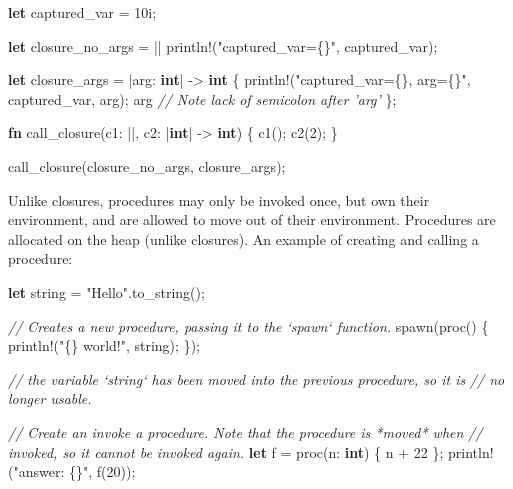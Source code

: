 \documentclass[]{article}
\newenvironment{Shaded}{}{}
\newcommand{\KeywordTok}[1]{\textcolor[rgb]{0.00,0.44,0.13}{\textbf{{#1}}}}
\newcommand{\DecValTok}[1]{\textcolor[rgb]{0.25,0.63,0.44}{{#1}}}
\newcommand{\StringTok}[1]{\textcolor[rgb]{0.25,0.44,0.63}{{#1}}}
\newcommand{\CommentTok}[1]{\textcolor[rgb]{0.38,0.63,0.69}{\textit{{#1}}}}
\newcommand{\OtherTok}[1]{\textcolor[rgb]{0.00,0.44,0.13}{{#1}}}
\newcommand{\NormalTok}[1]{{#1}}
\begin{document}
\begin{Shaded}
\begin{Highlighting}[]
\KeywordTok{let} \NormalTok{captured_var = }\DecValTok{10i}\NormalTok{;}

\KeywordTok{let} \NormalTok{closure_no_args = || }\OtherTok{println!}\NormalTok{(}\StringTok{"captured_var=\{\}"}\NormalTok{, captured_var);}

\KeywordTok{let} \NormalTok{closure_args = |arg: }\KeywordTok{int}\NormalTok{| -> }\KeywordTok{int} \NormalTok{\{}
  \OtherTok{println!}\NormalTok{(}\StringTok{"captured_var=\{\}, arg=\{\}"}\NormalTok{, captured_var, arg);}
  \NormalTok{arg }\CommentTok{// Note lack of semicolon after 'arg'}
\NormalTok{\};}

\KeywordTok{fn} \NormalTok{call_closure(c1: ||, c2: |}\KeywordTok{int}\NormalTok{| -> }\KeywordTok{int}\NormalTok{) \{}
  \NormalTok{c1();}
  \NormalTok{c2(}\DecValTok{2}\NormalTok{);}
\NormalTok{\}}

\NormalTok{call_closure(closure_no_args, closure_args);}
\end{Highlighting}
\end{Shaded}

Unlike closures, procedures may only be invoked once, but own their
environment, and are allowed to move out of their environment.
Procedures are allocated on the heap (unlike closures). An example of
creating and calling a procedure:

\begin{Shaded}
\begin{Highlighting}[]
\KeywordTok{let} \NormalTok{string = }\StringTok{"Hello"}\NormalTok{.to_string();}

\CommentTok{// Creates a new procedure, passing it to the `spawn` function.}
\NormalTok{spawn(proc() \{}
  \OtherTok{println!}\NormalTok{(}\StringTok{"\{\} world!"}\NormalTok{, string);}
\NormalTok{\});}

\CommentTok{// the variable `string` has been moved into the previous procedure, so it is}
\CommentTok{// no longer usable.}


\CommentTok{// Create an invoke a procedure. Note that the procedure is *moved* when}
\CommentTok{// invoked, so it cannot be invoked again.}
\KeywordTok{let} \NormalTok{f = proc(n: }\KeywordTok{int}\NormalTok{) \{ n + }\DecValTok{22} \NormalTok{\};}
\OtherTok{println!}\NormalTok{(}\StringTok{"answer: \{\}"}\NormalTok{, f(}\DecValTok{20}\NormalTok{));}
\end{Highlighting}
\end{Shaded}
\end{document}
